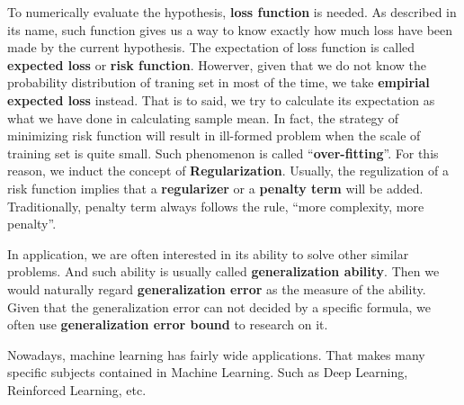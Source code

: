 \documentclass{book}
\begin{document}
To numerically evaluate the hypothesis, \textbf{loss function} is needed. As described in its name, such function gives us a way to know exactly how much loss have been made by the current hypothesis.
The expectation of loss function is called \textbf{expected loss} or \textbf{risk function}. Howerver, given that we do not know the probability distribution of traning set in most of the time, we take 
\textbf{empirial expected loss} instead. That is to said, we try to calculate its expectation as what we have done in calculating sample mean. In fact, the strategy of minimizing risk function will 
result in ill-formed problem when the scale of training set is quite small. Such phenomenon is called ``\textbf{over-fitting}''. For this reason, we induct the concept of \textbf{Regularization}.
Usually, the regulization of a risk function implies that a \textbf{regularizer} or a \textbf{penalty term} will be added. Traditionally, penalty term always follows the rule, ``more complexity,
more penalty''.

In application, we are often interested in its ability to solve other similar problems. And such ability is usually called \textbf{generalization ability}. Then we would naturally regard
\textbf{generalization error} as the measure of the ability. Given that the generalization error can not decided by a specific formula, we often use \textbf{generalization error bound} to research on it.

Nowadays, machine learning has fairly wide applications. That makes many specific subjects contained in Machine Learning. Such as Deep Learning, Reinforced Learning, etc.





\end{document}
